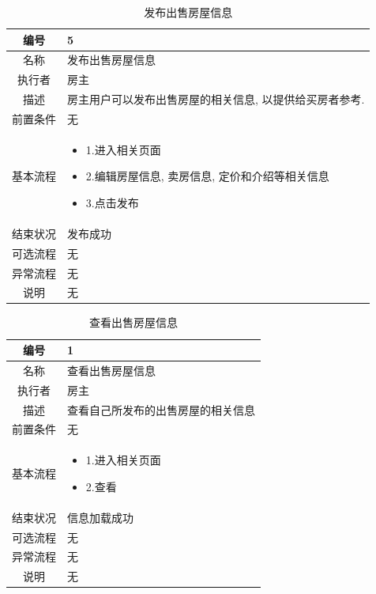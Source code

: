 \begin{table}[htbp]
	\centering
	\begin{tabular}{|c|p{11cm}|}
        \hline
        编号 & 5 \\
        \hline
        名称 & 发布出售房屋信息 \\ 
        \hline
        执行者 & 房主 \\
        \hline
        描述 & 房主用户可以发布出售房屋的相关信息,  以提供给买房者参考.        \\
        \hline
        前置条件 & 无 \\
        \hline
        基本流程 & \begin{itemize}
            \item 1.进入相关页面
            \item 2.编辑房屋信息, 卖房信息, 定价和介绍等相关信息
            \item 3.点击发布
        \end{itemize} \\
        \hline
        结束状况 & 发布成功 \\
        \hline
        可选流程 & 无 \\
        \hline
        异常流程 & 无 \\
        \hline
        说明 & 无 \\
        \hline
    \end{tabular}
    \caption{发布出售房屋信息}
\end{table}

\begin{table}[htbp]
	\centering
	\begin{tabular}{|c|p{11cm}|}
        \hline
        编号 & 1 \\
        \hline
        名称 & 查看出售房屋信息 \\ 
        \hline
        执行者 & 房主 \\
        \hline
        描述 & 查看自己所发布的出售房屋的相关信息        \\
        \hline
        前置条件 & 无 \\
        \hline
        基本流程 & \begin{itemize}
            \item 1.进入相关页面
            \item 2.查看
            
        \end{itemize} \\
        \hline
        结束状况 & 信息加载成功 \\
        \hline
        可选流程 & 无 \\
        \hline
        异常流程 & 无 \\
        \hline
        说明 & 无 \\
        \hline
    \end{tabular}
    \caption{查看出售房屋信息}
\end{table}

